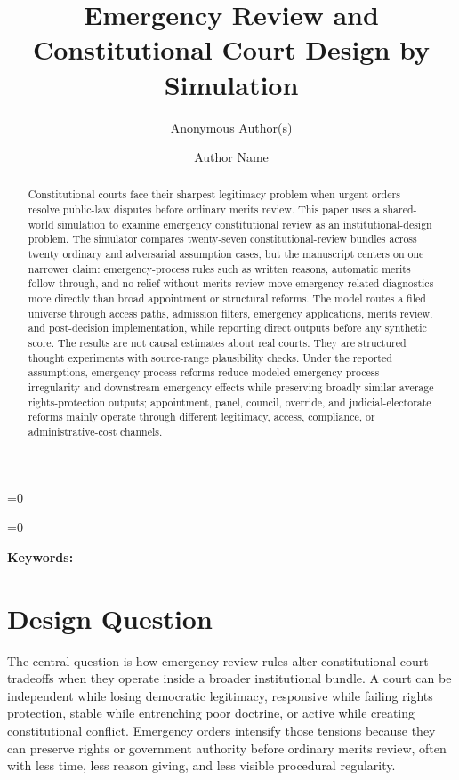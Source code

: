 \documentclass[
    journal=jlc,
    manuscript=research-article,
    year=2026,
  ]{cup-journal}
\title{Emergency Review and Constitutional Court Design by Simulation}
\date{}
\author{Anonymous Author(s)}
\affiliation{Affiliation suppressed for anonymous review}
\author{Author Name}
\affiliation{Author Affiliation}
\def\paperusescup{1}
\def\paperusescup{0}
\providecommand{\printkeywords}{\par\noindent\textbf{Keywords:} \paperkeywords\par}
\begin{document}
\ifnum\paperusescup=0
  \maketitle
\fi

\begin{abstract}
Constitutional courts face their sharpest legitimacy problem when urgent orders resolve public-law disputes before ordinary merits review. This paper uses a shared-world simulation to examine emergency constitutional review as an institutional-design problem. The simulator compares twenty-seven constitutional-review bundles across twenty ordinary and adversarial assumption cases, but the manuscript centers on one narrower claim: emergency-process rules such as written reasons, automatic merits follow-through, and no-relief-without-merits review move emergency-related diagnostics more directly than broad appointment or structural reforms. The model routes a filed universe through access paths, admission filters, emergency applications, merits review, and post-decision implementation, while reporting direct outputs before any synthetic score. The results are not causal estimates about real courts. They are structured thought experiments with source-range plausibility checks. Under the reported assumptions, emergency-process reforms reduce modeled emergency-process irregularity and downstream emergency effects while preserving broadly similar average rights-protection outputs; appointment, panel, council, override, and judicial-electorate reforms mainly operate through different legitimacy, access, compliance, or administrative-cost channels.
\end{abstract}

\ifnum\paperusescup=0
  \printkeywords
\fi

\section{Design Question}

The central question is how emergency-review rules alter constitutional-court tradeoffs when they operate inside a broader institutional bundle. A court can be independent while losing democratic legitimacy, responsive while failing rights protection, stable while entrenching poor doctrine, or active while creating constitutional conflict. Emergency orders intensify those tensions because they can preserve rights or government authority before ordinary merits review, often with less time, less reason giving, and less visible procedural regularity.
\end{document}
